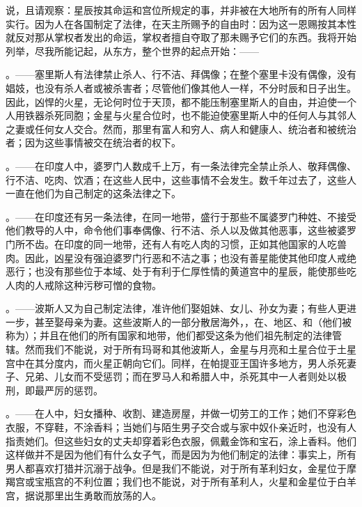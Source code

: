  说，且请观察：星辰按其命运和宫位所规定的事，并非被在大地所有的所有人同样实行。因为人在各国制定了法律，在天主所赐予的自由时：因为这一恩赐按其本性就反对那从掌权者发出的命运，掌权者擅自夺取了那未赐予它们的东西。我将开始列举，尽我所能记起，从东方，整个世界的起点开始：——\par

。——塞里斯人有法律禁止杀人、行不洁、拜偶像；在整个塞里卡没有偶像，没有娼妓，也没有杀人者或被杀害者；尽管他们像其他人一样，不分时辰和日子出生。因此，凶悍的火星，无论何时位于天顶，都不能压制塞里斯人的自由，并迫使一个人用铁器杀死同胞；金星与火星合位时，也不能迫使塞里斯人中的任何人与其邻人之妻或任何女人交合。然而，那里有富人和穷人、病人和健康人、统治者和被统治者；因为这些事情被交在统治者的权下。\par

。——在印度人中，婆罗门人数成千上万，有一条法律完全禁止杀人、敬拜偶像、行不洁、吃肉、饮酒；在这些人民中，这些事情不会发生。数千年过去了，这些人一直在他们为自己制定的这条法律之下。\par

。——在印度还有另一条法律，在同一地带，盛行于那些不属婆罗门种姓、不接受他们教导的人中，命令他们事奉偶像、行不洁、杀人以及做其他恶事，这些被婆罗门所不齿。在印度的同一地带，还有人有吃人肉的习惯，正如其他国家的人吃兽肉。因此，凶星没有强迫婆罗门行恶和不洁之事；也没有善星能使其他印度人戒绝恶行；也没有那些位于本域、处于有利于仁厚性情的黄道宫中的星辰，能使那些吃人肉的人戒除这种污秽可憎的食物。\par

。——波斯人又为自己制定法律，准许他们娶姐妹、女儿、孙女为妻；有些人更进一步，甚至娶母亲为妻。这些波斯人的一部分散居海外，，在、地区、和（他们被称为）；并且在他们的所有国家和地带，他们都受这条为他们祖先制定的法律管辖。然而我们不能说，对于所有玛哥和其他波斯人，金星与月亮和土星合位于土星宫中在其分度内，而火星正朝向它们。同样，在帕提亚王国许多地方，男人杀死妻子、兄弟、儿女而不受惩罚；而在罗马人和希腊人中，杀死其中一人者则处以极刑，即最严厉的惩罚。\par

。——在人中，妇女播种、收割、建造房屋，并做一切劳工的工作；她们不穿彩色衣服，不穿鞋，不涂香料；当她们与陌生男子交合或与家中奴仆亲近时，也没有人指责她们。但这些妇女的丈夫却穿着彩色衣服，佩戴金饰和宝石，涂上香料。他们这样做并不是因为他们有什么女子气，而是因为为他们制定的法律：事实上，所有男人都喜欢打猎并沉溺于战争。但是我们不能说，对于所有革利妇女，金星位于摩羯宫或宝瓶宫的不利位置；我们也不能说，对于所有革利人，火星和金星位于白羊宫，据说那里出生勇敢而放荡的人。\par

